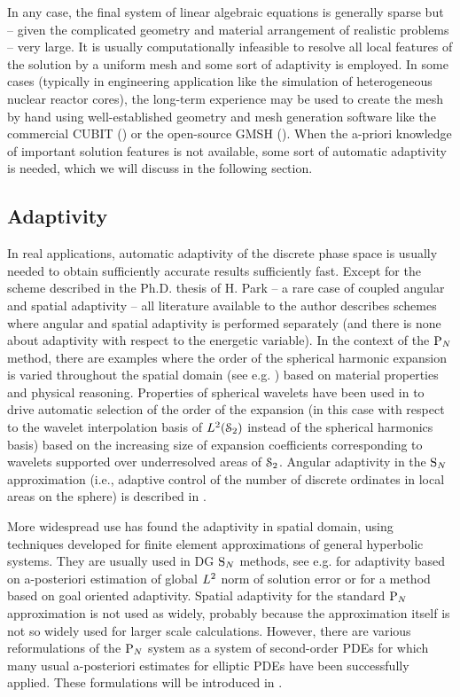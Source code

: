 In any case, the final system of linear algebraic equations is generally sparse but -- given the complicated geometry
and material arrangement of realistic problems -- very large. It is usually computationally infeasible to resolve all
local features of the solution by a uniform mesh and some sort of adaptivity is employed. In some cases (typically in
engineering application like the simulation of heterogeneous nuclear reactor cores), the long-term experience may be
used to create the mesh by hand using well-established geometry and mesh generation software like the commercial CUBIT
(\cite{CUBIT}) or the open-source GMSH (\cite{GMSH}). When the a-priori knowledge of important solution features is not
available, some sort of automatic adaptivity is needed, which we will discuss in the following section.

\subsection{Adaptivity}
In real applications, automatic adaptivity of the discrete phase space is usually needed to obtain sufficiently accurate
results sufficiently fast. Except for the scheme described in the Ph.D. thesis of H. Park \cite{Park} -- a rare case of coupled angular and spatial adaptivity -- all literature
available to the author describes schemes where angular and spatial adaptivity is performed separately (and there is
none about adaptivity with respect to the energetic variable). In the context of the $\PN$ method, there are examples
where the order of the spherical harmonic expansion is varied throughout the spatial domain (see e.g. \cite{Ackroyd2})
based on material properties and physical reasoning. Properties of spherical wavelets have been used in \cite{Buchan} to
drive automatic selection of the order of the expansion (in this case with respect to the wavelet interpolation basis of
$\Lp[2](\Sphere)$ instead of the spherical harmonics basis) based on the increasing size of expansion coefficients
corresponding to wavelets supported over underresolved areas of $\Sphere$. Angular adaptivity in the $\SN$ approximation
(i.e., adaptive control of the number of discrete ordinates in local areas on the sphere) is described in
\cite{Jarrell}.

More widespread use has found the adaptivity in spatial domain, using techniques developed for finite element
approximations of general hyperbolic systems. They are usually used in DG $\SN$ methods, see e.g.
\cite{Fournier,Duo,ragusa2010two} for adaptivity based on a-posteriori estimation of global $\Lp[2]$ norm of solution
error or \cite{LathouwersGoal, Wang2} for a method based on goal oriented adaptivity. Spatial adaptivity for the
standard $\PN$ approximation is not used as widely, probably because the approximation itself is not so widely used for
larger scale calculations. However, there are various reformulations of the $\PN$ system as a system of second-order
PDEs for which many usual a-posteriori estimates for
elliptic PDEs have been successfully applied. These formulations will be introduced in .

